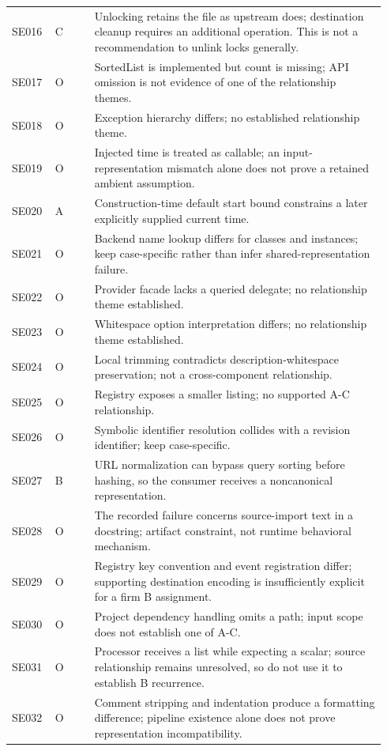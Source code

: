 \begin{longtable}{@{}p{0.10\linewidth}p{0.10\linewidth}p{0.74\linewidth}@{}}
SE016 & C & Unlocking retains the file as upstream does; destination cleanup requires an additional operation. This is not a recommendation to unlink locks generally. \\
SE017 & O & SortedList is implemented but count is missing; API omission is not evidence of one of the relationship themes. \\
SE018 & O & Exception hierarchy differs; no established relationship theme. \\
SE019 & O & Injected time is treated as callable; an input-representation mismatch alone does not prove a retained ambient assumption. \\
SE020 & A & Construction-time default start bound constrains a later explicitly supplied current time. \\
SE021 & O & Backend name lookup differs for classes and instances; keep case-specific rather than infer shared-representation failure. \\
SE022 & O & Provider facade lacks a queried delegate; no relationship theme established. \\
SE023 & O & Whitespace option interpretation differs; no relationship theme established. \\
SE024 & O & Local trimming contradicts description-whitespace preservation; not a cross-component relationship. \\
SE025 & O & Registry exposes a smaller listing; no supported A-C relationship. \\
SE026 & O & Symbolic identifier resolution collides with a revision identifier; keep case-specific. \\
SE027 & B & URL normalization can bypass query sorting before hashing, so the consumer receives a noncanonical representation. \\
SE028 & O & The recorded failure concerns source-import text in a docstring; artifact constraint, not runtime behavioral mechanism. \\
SE029 & O & Registry key convention and event registration differ; supporting destination encoding is insufficiently explicit for a firm B assignment. \\
SE030 & O & Project dependency handling omits a path; input scope does not establish one of A-C. \\
SE031 & O & Processor receives a list while expecting a scalar; source relationship remains unresolved, so do not use it to establish B recurrence. \\
SE032 & O & Comment stripping and indentation produce a formatting difference; pipeline existence alone does not prove representation incompatibility. \\

\end{longtable}
